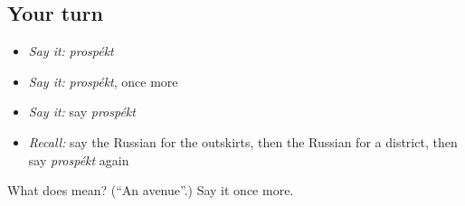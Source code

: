 \subsection*{Your turn}
\begin{itemize}
\raggedright
  \item \emph{Say it:} \emph{prospékt}
  \item \emph{Say it:} \emph{prospékt}, once more
  \item \emph{Say it:} say \emph{prospékt}
  \item \emph{Recall:} say the Russian for the outskirts, then the Russian for a district, then say \emph{prospékt} again
\end{itemize}

\begin{tcolorbox}[breakable,colback=teal!4,colframe=teal!35!black,title={Before you move on}]
What does  mean? (\textquotedblleft{}An avenue\textquotedblright{}.) Say it once more.
\end{tcolorbox}
